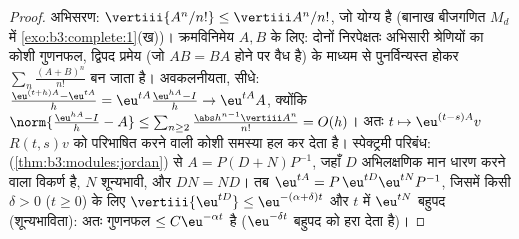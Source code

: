 \begin{proof}
अभिसरण: $\vertiii{A^n/n!} \leq \vertiii A^n/n!$, जो योग्य है (बानाख बीजगणित $M_d$ में \cref{exo:b3:complete:1}(ख))।
क्रमविनिमेय $A, B$ के लिए: दोनों निरपेक्षतः अभिसारी श्रेणियों का
कोशी गुणनफल, द्विपद प्रमेय (जो $AB = BA$ होने पर वैध है) के माध्यम से
पुनर्विन्यस्त होकर $\sum_n\frac{(A+B)^n}{n!}$ बन जाता है। अवकलनीयता, सीधे: $\frac{\eu^{(t+h)A} - \eu^{tA}}h = \eu^{tA}\frac{\eu^{hA} -
I}{h} \to \eu^{tA}A$,
क्योंकि $\norm{\frac{\eu^{hA} - I}h - A}
\leq \sum_{n\geq2}\frac{\abs h^{n-1}\vertiii A^n}{n!} =
O(h)$। अतः $t \mapsto \eu^{(t - s)A}v$ $R(t,s)v$ को परिभाषित करने वाली कोशी समस्या
हल कर देता है। स्पेक्ट्रमी परिबंध:  (\cref{thm:b3:modules:jordan}) से $A = P(D + N)P^{-1}$,
जहाँ $D$ अभिलक्षणिक मान धारण करने वाला विकर्ण है, $N$
शून्यभावी, और $DN =
ND$। तब $\eu^{tA} = P\,\eu^{tD}\eu^{tN}P^{-1}$, जिसमें किसी $\delta > 0$ ($t \geq 0$) के लिए
$\vertiii{\eu^{tD}} \leq \eu^{-(\alpha + \delta)t}$ और $t$ में $\eu^{tN}$ बहुपद (शून्यभाविता): अतः गुणनफल $\leq C\eu^{-\alpha t}$
है ($\eu^{-\delta t}$ बहुपद को हरा देता है)।
\end{proof}

